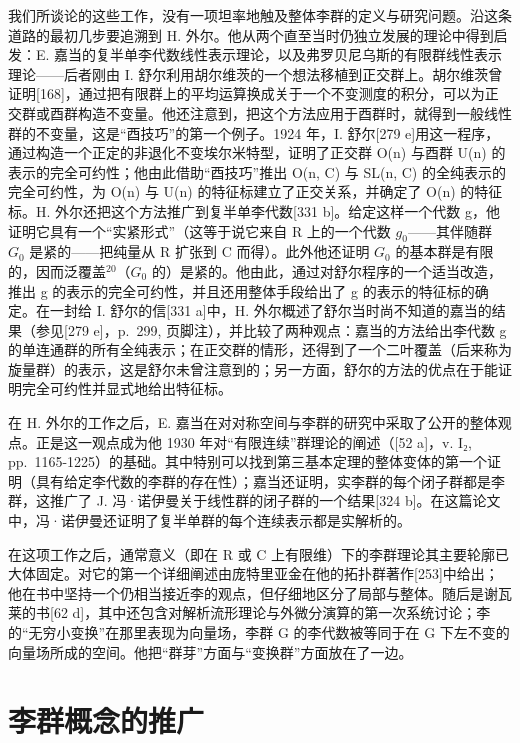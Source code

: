 我们所谈论的这些工作，没有一项坦率地触及整体李群的定义与研究问题。沿这条道路的最初几步要追溯到 H. 外尔。他从两个直至当时仍独立发展的理论中得到启发：E. 嘉当的复半单李代数线性表示理论，以及弗罗贝尼乌斯的有限群线性表示理论——后者刚由 I. 舒尔利用胡尔维茨的一个想法移植到正交群上。胡尔维茨曾证明{[}168{]}，通过把有限群上的平均运算换成关于一个不变测度的积分，可以为正交群或酉群构造不变量。他还注意到，把这个方法应用于酉群时，就得到一般线性群的不变量，这是“酉技巧”的第一个例子。1924 年，I. 舒尔{[}279 e{]}用这一程序，通过构造一个正定的非退化不变埃尔米特型，证明了正交群 O(n) 与酉群 U(n) 的表示的完全可约性；他由此借助“酉技巧”推出 O(n, C) 与 SL(n, C) 的全纯表示的完全可约性，为 O(n) 与 U(n) 的特征标建立了正交关系，并确定了 O(n) 的特征标。H. 外尔还把这个方法推广到复半单李代数{[}331 b{]}。给定这样一个代数 g，他证明它具有一个“实紧形式”（这等于说它来自 R 上的一个代数 \(g_{0}\)——其伴随群 \(G_{0}\) 是紧的——把纯量从 R 扩张到 C 而得）。此外他还证明 \(G_{0}\) 的基本群是有限的，因而泛覆盖\(^{20}\)（\(G_{0}\) 的）是紧的。他由此，通过对舒尔程序的一个适当改造，推出 g 的表示的完全可约性，并且还用整体手段给出了 g 的表示的特征标的确定。在一封给 I. 舒尔的信{[}331 a{]}中，H. 外尔概述了舒尔当时尚不知道的嘉当的结果（参见{[}279 e{]}，p.~299, 页脚注），并比较了两种观点：嘉当的方法给出李代数 g 的单连通群的所有全纯表示；在正交群的情形，还得到了一个二叶覆盖（后来称为旋量群）的表示，这是舒尔未曾注意到的；另一方面，舒尔的方法的优点在于能证明完全可约性并显式地给出特征标。

在 H. 外尔的工作之后，E. 嘉当在对对称空间与李群的研究中采取了公开的整体观点。正是这一观点成为他 1930 年对“有限连续”群理论的阐述（{[}52 a{]}，v. I₂, pp.~1165-1225）的基础。其中特别可以找到第三基本定理的整体变体的第一个证明（具有给定李代数的李群的存在性）；嘉当还证明，实李群的每个闭子群都是李群，这推广了 J. 冯·诺伊曼关于线性群的闭子群的一个结果{[}324 b{]}。在这篇论文中，冯·诺伊曼还证明了复半单群的每个连续表示都是实解析的。

在这项工作之后，通常意义（即在 R 或 C 上有限维）下的李群理论其主要轮廓已大体固定。对它的第一个详细阐述由庞特里亚金在他的拓扑群著作{[}253{]}中给出；他在书中坚持一个仍相当接近李的观点，但仔细地区分了局部与整体。随后是谢瓦莱的书{[}62 d{]}，其中还包含对解析流形理论与外微分演算的第一次系统讨论；李的“无穷小变换”在那里表现为向量场，李群 G 的李代数被等同于在 G 下左不变的向量场所成的空间。他把“群芽”方面与“变换群”方面放在了一边。

\section{李群概念的推广}

